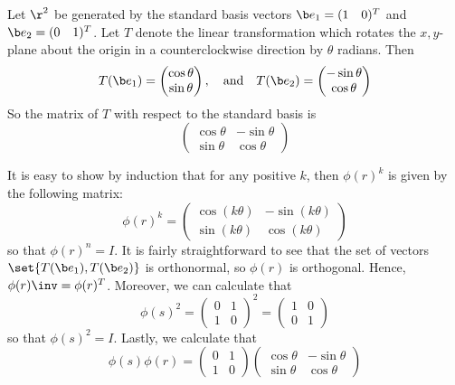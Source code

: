 \begin{solalph}
    \item Let $\r^2$ be generated by the standard basis vectors $\b e_1 = (1 \quad 0)^T$ and $\b e_2 = (0 \quad 1)^T$. Let $T$ denote the linear transformation which rotates the $x,y$-plane about the origin in a counterclockwise direction by $\theta$ radians. Then
    \[T(\b e_1) = 
    \begin{pmatrix}
        \cos \theta \\
        \sin \theta
    \end{pmatrix}, \quad \text{and} \quad
    T(\b e_2) = 
    \begin{pmatrix}
        -\sin \theta \\
        \cos \theta
    \end{pmatrix}\]
    So the matrix of $T$ with respect to the standard basis is
    \[\begin{pmatrix}
        \cos \theta & -\sin \theta \\
        \sin \theta & \cos \theta
    \end{pmatrix}\]
    \item It is easy to show by induction that for any positive $k$, then $\phi(r)^k$ is given by the following matrix:
    \[\phi(r)^k = \begin{pmatrix}
        \cos (k\theta) & -\sin (k\theta) \\
        \sin (k\theta) & \cos (k\theta)
    \end{pmatrix}\]
    so that $\phi(r)^n = I$. It is fairly straightforward to see that the set of vectors $\set{T(\b e_1), T(\b e_2)}$ is orthonormal, so $\phi(r)$ is orthogonal. Hence, $\phi(r)\inv = \phi(r)^T$. Moreover, we can calculate that
    \[\phi(s)^2 =
    \begin{pmatrix}
        0 & 1 \\
        1 & 0
    \end{pmatrix}^2 =
    \begin{pmatrix}
        1 & 0 \\
        0 & 1
    \end{pmatrix}
    \]
    so that $\phi(s)^2 = I$. Lastly, we calculate that
    \[\phi(s)\phi(r) = 
    \begin{pmatrix}
        0 & 1 \\
        1 & 0
    \end{pmatrix}
    \begin{pmatrix}
        \cos \theta & -\sin \theta \\
        \sin \theta & \cos \theta

\end{pmatrix}\]
\end{solalph}
